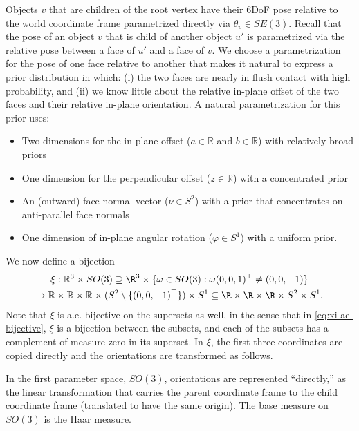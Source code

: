 Objects $v$ that are children of the root vertex have their 6DoF pose relative to the world coordinate frame parametrized directly via $\theta_v \in SE(3)$.
Recall that the pose of an object $v$ that is child of another object $u'$
is parametrized via the relative pose between a face of $u'$ and a face of $v$.
We choose a parametrization for the pose of one face relative to another that makes it natural to express a prior distribution in which:
(i) the two faces are nearly in flush contact with high probability, and
(ii) we know little about the relative in-plane offset of the two faces and their relative in-plane orientation.
A natural parametrization for this prior uses:
\begin{itemize}
\item Two dimensions for the in-plane offset
($a \in \mathbb{R}$ and $b \in \mathbb{R}$)
with relatively broad priors
\item One dimension for the perpendicular offset
($z \in \mathbb{R}$)
with a concentrated prior
\item An (outward) face normal vector
($\nu \in S^2$)
with a prior that concentrates on anti-parallel face normals
\item One dimension of in-plane angular rotation
($\varphi \in S^1$)
with a uniform prior.
\end{itemize}
We now define a bijection
\begin{multline}
\xi :
\mathbb{R}^3 \times SO(3)
\supseteq \R^3 \times \{\omega \in SO(3) : \omega(0,0,1)^\top \neq (0,0,-1)\} \\
\to \mathbb{R} \times \mathbb{R} \times \mathbb{R} \times (S^2 \setminus \{(0, 0, -1)^\top\}) \times S^1
\subseteq \R \times \R \times \R \times S^2 \times S^1.
\label{eq:xi-ae-bijective}
\end{multline}
Note that $\xi$ is a.e.{} bijective on the supersets as well, in the sense that in \eqref{eq:xi-ae-bijective}, $\xi$ is a bijection between the subsets, and each of the subsets has a complement of measure zero in its superset.
In $\xi$, the first three coordinates are copied directly and the orientations are transformed as follows.


In the first parameter space, $SO(3)$, orientations are represented ``directly,'' as the linear transformation that carries the parent coordinate frame to the child coordinate frame (translated to have the same origin).  The base measure on $SO(3)$ is the Haar measure.

